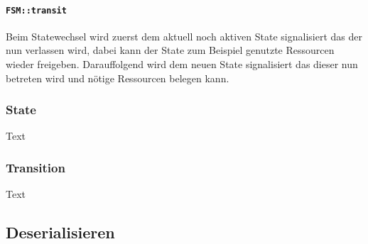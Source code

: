 \paragraph{\texttt{FSM::transit}}

Beim Statewechsel wird zuerst dem aktuell noch aktiven State signalisiert das der nun verlassen wird, dabei kann der State
zum Beispiel genutzte Ressourcen wieder freigeben. Darauffolgend wird dem neuen State signalisiert das dieser nun betreten wird und nötige Ressourcen belegen kann.


\subsubsection{State}
Text


\subsubsection{Transition}
Text

\subsection{Deserialisieren}
